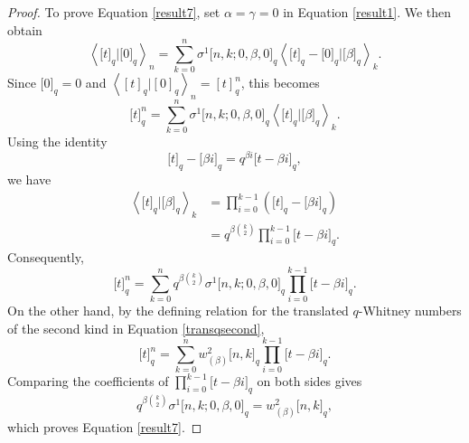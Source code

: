 \documentclass[12pt]{article}
\begin{document}
\begin{proof}
	To prove Equation \eqref{result7}, set $\alpha=\gamma=0$ in Equation \eqref{result1}. We then obtain
	\begin{equation*}
		\left\langle \big[t\big]_q|\big[0\big]_q\right\rangle_n
		=
		\sum_{k=0}^{n}
		\sigma^1\big[n,k;0,\beta,0\big]_q
		\left\langle
		\big[t\big]_q-\big[0\big]_q
		\big|
		\big[\beta\big]_q
		\right\rangle_k.
	\end{equation*}
	Since $\big[0\big]_q=0$ and
	$\left\langle [t]_q|[0]_q\right\rangle_n=[t]_q^n$, this becomes
	\begin{equation*}
		\big[t\big]_q^n
		=
		\sum_{k=0}^{n}
		\sigma^1\big[n,k;0,\beta,0\big]_q
		\left\langle
		\big[t\big]_q
		\big|
		\big[\beta\big]_q
		\right\rangle_k.
	\end{equation*}
	Using the identity
	\begin{equation*}
		\big[t\big]_q-\big[\beta i\big]_q
		=
		q^{\beta i}\big[t-\beta i\big]_q,
	\end{equation*}
	we have
	\begin{align*}
		\left\langle
		\big[t\big]_q
		\big|
		\big[\beta\big]_q
		\right\rangle_k
		&=
		\prod_{i=0}^{k-1}
		\left(
		\big[t\big]_q-\big[\beta i\big]_q
		\right)\\
		&=
		q^{\beta\binom{k}{2}}
		\prod_{i=0}^{k-1}
		\big[t-\beta i\big]_q.
	\end{align*}
	Consequently,
	\begin{equation*}
		\big[t\big]_q^n
		=
		\sum_{k=0}^{n}
		q^{\beta\binom{k}{2}}
		\sigma^1\big[n,k;0,\beta,0\big]_q
		\prod_{i=0}^{k-1}
		\big[t-\beta i\big]_q.
	\end{equation*}
	On the other hand, by the defining relation for the translated $q$-Whitney numbers of the second kind in Equation \eqref{transqsecond},
	\begin{equation*}
		\big[t\big]_q^n
		=
		\sum_{k=0}^{n}
		w^2_{(\beta)}\big[n,k\big]_q
		\prod_{i=0}^{k-1}
		\big[t-\beta i\big]_q.
	\end{equation*}
	Comparing the coefficients of
	$\displaystyle\prod_{i=0}^{k-1}\big[t-\beta i\big]_q$
	on both sides gives
	\begin{equation*}
		q^{\beta\binom{k}{2}}
		\sigma^1\big[n,k;0,\beta,0\big]_q
		=
		w^2_{(\beta)}\big[n,k\big]_q,
	\end{equation*}
	which proves Equation \eqref{result7}.
	

\end{proof}
\end{document}
